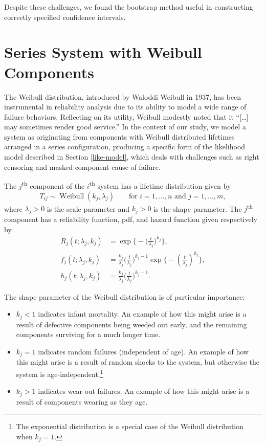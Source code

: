 \documentclass[
]{article}
\providecommand{\tightlist}{%
  \setlength{\itemsep}{0pt}\setlength{\parskip}{0pt}}
\theoremstyle{definition}
\theoremstyle{plain}
\theoremstyle{definition}
\theoremstyle{definition}
\theoremstyle{definition}
\theoremstyle{definition}
\theoremstyle{remark}
\begin{document}
Despite these challenges, we found the bootstrap method useful in constructing
correctly specified confidence intervals.

\hypertarget{weibull}{%
\section{Series System with Weibull Components}\label{weibull}}

The Weibull distribution, introduced by Waloddi Weibull in 1937, has been
instrumental in reliability analysis due to its ability to model a wide range
of failure behaviors. Reflecting on its utility, Weibull
modestly noted that it ``{[}\ldots{]} may sometimes render good service.'' \citep{Abernethy2006}
In the context of our study, we model a system as originating from components
with Weibull distributed lifetimes arranged in a series configuration,
producing a specific form of the likelihood model described in Section \ref{like-model},
which deals with challenges such as right censoring and masked component cause of failure.

The \(j\)\textsuperscript{th} component of the \(i\)\textsuperscript{th} system has a
lifetime distribution given by
\[
    T_{i j} \sim \operatorname{Weibull}(k_j,\lambda_j) \qquad \text{for } i = 1,\ldots,n \text{ and } j = 1,\ldots,m,
\]
where \(\lambda_j > 0\) is the scale parameter and \(k_j > 0\) is the shape parameter.
The \(j\)\textsuperscript{th} component has a reliability function, pdf, and hazard function
given respectively by
\begin{align}
    R_j(t;\lambda_j,k_j)
        &= \exp\biggl\{-\biggl(\frac{t}{\lambda_j}\biggr)^{k_j}\biggr\},\\
    f_j(t;\lambda_j,k_j)
        &= \frac{k_j}{\lambda_j}\biggl(\frac{t}{\lambda_j}\biggr)^{k_j-1}
        \exp\biggl\{-\left(\frac{t}{\lambda_j}\right)^{k_j} \biggr\},\\
    h_j(t;\lambda_j,k_j) \label{eq:weibull-haz}
        &= \frac{k_j}{\lambda_j}\biggl(\frac{t}{\lambda_j}\biggr)^{k_j-1}.
\end{align}

The shape parameter of the Weibull distribution is of particular importance:

\begin{itemize}
\tightlist
\item
  \(k_j < 1\) indicates infant mortality. An example of how this might arise is
  a result of defective components being weeded out early, and the remaining
  components surviving for a much longer time.
\item
  \(k_j = 1\) indicates random failures (independent of age). An example of how
  this might arise is a result of random shocks to the system, but otherwise
  the system is age-independent.\footnote{The exponential distribution is a special case of the Weibull distribution
    when \(k_j = 1\).}
\item
  \(k_j > 1\) indicates wear-out failures. An example of how this might arise is a
  result of components wearing as they age.
\end{itemize}
\end{document}
